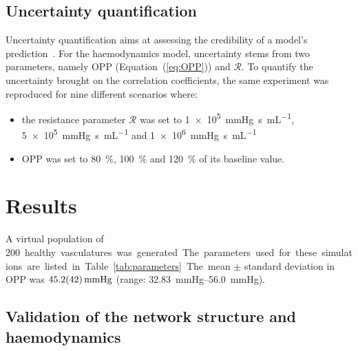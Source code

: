 \documentclass[11pt,]{article}
\begin{document}
\subsection{Uncertainty quantification}\label{sec:methods-UQ}

Uncertainty quantification aims at assessing the credibility of a model's prediction~\cite{ASME2018,Viceconti2021}.
For the haemodynamics model, uncertainty stems from two parameters, namely OPP (Equation~(\ref{eq:OPP})) and $\mathcal R$.
To quantify the uncertainty brought on the correlation coefficients, the same experiment was reproduced for nine different scenarios where:
\begin{itemize}
\item the resistance parameter $\mathcal R$ was set to \SI[per-mode=symbol]{1e5}{\mmHg\second\per\mL}, \SI[per-mode=symbol]{5e5}{\mmHg\second\per\mL} and \SI[per-mode=symbol]{1e6}{\mmHg\second\per\mL}
\item OPP was set to \SI{80}{\percent}, \SI{100}{\percent} and \SI{120}{\percent} of its baseline value.
\end{itemize}

\section{Results}\label{sec:results}

A virtual population of \SI{200} healthy vasculatures was generated.
The parameters used for these simulations are listed in Table~\ref{tab:parameters}. %
The mean $\pm$ standard deviation in OPP was $\SI{45.2 \pm 4.2}{\mmHg}$ (range: \SIrange{32.83}{56.0}{\mmHg}).

\subsection{Validation of the network structure and haemodynamics}\label{sec:validation}
\end{document}
